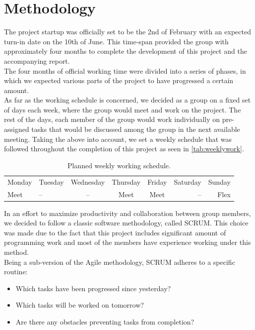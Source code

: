 
\chapter{Methodology} %

\label{ch:method} %


The project startup was officially set to be the 2nd of February with an expected turn-in date on the 10th of June. This time-span provided the group with approximately four months to complete the development of this project and the accompanying report.\\
The four months of official working time were divided into a series of phases, in which we expected various parts of the project to have progressed a certain amount.\\

As far as the working schedule is concerned, we decided as a group on a fixed set of days each week, where the group would meet and work on the project. The rest of the days, each member of the group would work individually on pre-assigned tasks that would be discussed among the group in the next available meeting. Taking the above into account, we set a weekly schedule that was followed throughout the completion of this project as seen in \autoref{tab:weeklywork}.
\begin{table}[h!]
\centering
\begin{tabular}{ l | l | c | c | c | r | r }
Monday & Tuesday & Wednesday & Thursday & Friday & Saturday & Sunday \\
Meet & -- & -- & Meet & Meet & -- & Flex
\end{tabular} 
\caption{Planned weekly working schedule.}
\label{tab:weeklywork}
\end{table}

In an effort to maximize productivity and collaboration between group members, we decided to follow a classic software methodology, called SCRUM. This choice was made due to the fact that this project includes significant amount of programming work and most of the members have experience working under this method. \\
Being a sub-version of the Agile methodology, SCRUM adheres to a specific routine:

\begin{itemize}
\item Which tasks have been progressed since yesterday?
\item Which tasks will be worked on tomorrow?
\item Are there any obstacles preventing tasks from completion?
\end{itemize}


